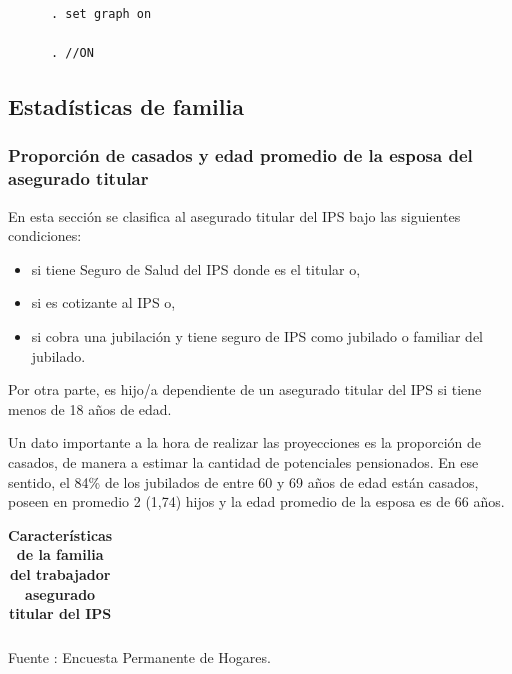 \begin{verbatim}
      . set graph on

      . //ON
\end{verbatim}

\subsection{Estadísticas de familia}\subsubsection{Proporción de casados y edad promedio de la esposa del asegurado titular}

En esta sección se clasifica al asegurado titular del IPS bajo las
siguientes condiciones:

\begin{itemize}
\item si tiene Seguro de Salud del IPS donde es el titular o,
\item si es cotizante al IPS o,
\item si cobra una jubilación y tiene seguro de IPS como jubilado o familiar del jubilado.
\end{itemize}

Por otra parte, es hijo/a dependiente de un asegurado titular del IPS si
tiene menos de 18 años de edad.

Un dato importante a la hora de realizar las proyecciones es la
proporción de casados, de manera a estimar la cantidad de potenciales
pensionados. En ese sentido, el 84\% de los jubilados de entre 60 y 69
años de edad están casados, poseen en promedio 2 (1,74) hijos y la edad
promedio de la esposa es de 66 años.

\begin{table}[H]
\begin{center}
\scriptsize
\caption{\bf{Características de la familia del trabajador asegurado titular del IPS}}
\begin{tabular}{l|rrrrrrrrrrrrrr}

\end{tabular}
                                    \item \footnotesize Fuente : Encuesta Permanente de Hogares.
\end{center}
\end{table}

